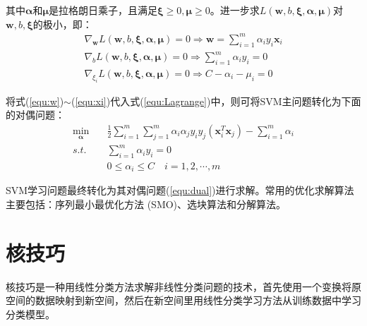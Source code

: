 其中$\mathbf{\alpha}$和$\mathbf{\mu}$是拉格朗日乘子，且满足$\mathbf{\xi} \ge 0,\mathbf{\mu} \ge 0$。进一步求$L(\mathbf{w},b,\mathbf{\xi},\mathbf{\alpha},\mathbf{\mu})$对$\mathbf{w},b,\mathbf{\xi}$的极小，即：
\begin{align} %
   \nabla_{\mathbf{w}}L(\mathbf{w},b,\mathbf{\xi},\mathbf{\alpha},\mathbf{\mu})=0 \Rightarrow \mathbf{w}=\sum^m_{i=1}\alpha_iy_i\mathbf{x}_i \label{equ:w} \\
   \nabla_{b}L(\mathbf{w},b,\mathbf{\xi},\mathbf{\alpha},\mathbf{\mu})=0 \Rightarrow \sum^m_{i=1}\alpha_iy_i=0 \label{equ:b} \\
   \nabla_{\xi_i}L(\mathbf{w},b,\mathbf{\xi},\mathbf{\alpha},\mathbf{\mu})=0 \Rightarrow C-\alpha_i-\mu_i=0 \label{equ:xi}
\end{align}

将式(\ref{equ:w})$\sim$(\ref{equ:xi})代入式(\ref{equ:Lagrange})中，则可将SVM主问题转化为下面的对偶问题：
\begin{equation}
\begin{split} %
   \min_{\mathbf{\alpha}} \quad & \frac{1}{2}\sum^m_{i=1}\sum^m_{j=1}\alpha_i\alpha_jy_iy_j(\mathbf{x}_i^T\mathbf{x}_j)-\sum^m_{i=1}\alpha_i \\
   s.t. \quad & \sum^m_{i=1}\alpha_iy_i=0 \\
   & 0 \le \alpha_i \le C \quad  i=1,2,\cdots,m
   \label{equ:dual}
\end{split}
\end{equation}

SVM学习问题最终转化为其对偶问题(\ref{equ:dual})进行求解。常用的优化求解算法主要包括：序列最小最优化方法 (SMO)、选块算法和分解算法。

\section{核技巧}
核技巧是一种用线性分类方法求解非线性分类问题的技术，首先使用一个变换将原空间的数据映射到新空间，然后在新空间里用线性分类学习方法从训练数据中学习分类模型。

